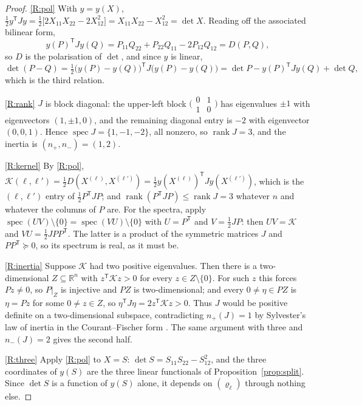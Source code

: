 \documentclass[11pt,a4paper]{article}
\theoremstyle{plain}
\theoremstyle{definition}
\newcommand{\R}{\mathbb{R}}
\newcommand{\T}{\mathsf{T}}
\newcommand{\PSD}{\succeq 0}
\DeclareMathOperator{\rank}{rank}
\begin{document}
\begin{proof}
\ref{R:pol} With $y=y(X)$,
$\tfrac12y^{\T}Jy=\tfrac12\bigl[2X_{11}X_{22}-2X_{12}^{2}\bigr]
=X_{11}X_{22}-X_{12}^{2}=\det X$. Reading off the associated bilinear form,
\[
  y(P)^{\T}Jy(Q)=P_{11}Q_{22}+P_{22}Q_{11}-2P_{12}Q_{12}=D(P,Q),
\]
so $D$ is the polarisation of $\det$, and since $y$ is linear,
\[
  \det(P-Q)=\tfrac12\bigl(y(P)-y(Q)\bigr)^{\T}J\bigl(y(P)-y(Q)\bigr)
  =\det P-y(P)^{\T}Jy(Q)+\det Q,
\]
which is the third relation.

\ref{R:rank} $J$ is block diagonal: the upper-left block
$\bigl(\begin{smallmatrix}0&1\\1&0\end{smallmatrix}\bigr)$ has eigenvalues
$\pm1$ with eigenvectors $(1,\pm1,0)$, and the remaining diagonal entry is
$-2$ with eigenvector $(0,0,1)$. Hence $\operatorname{spec}J=\{1,-1,-2\}$, all
nonzero, so $\rank J=3$, and the inertia is $(n_+,n_-)=(1,2)$.

\ref{R:kernel} By \ref{R:pol},
$\mathcal K(\ell,\ell')=\tfrac12D(X^{(\ell)},X^{(\ell')})
=\tfrac12y(X^{(\ell)})^{\T}Jy(X^{(\ell')})$, which is the $(\ell,\ell')$ entry
of $\tfrac12P^{\T}JP$; and $\rank(P^{\T}JP)\le\rank J=3$ whatever $n$ and
whatever the columns of $P$ are. For the spectra, apply
$\operatorname{spec}(UV)\setminus\{0\}
=\operatorname{spec}(VU)\setminus\{0\}$ with $U=P^{\T}$ and
$V=\tfrac12JP$: then $UV=\mathcal K$ and $VU=\tfrac12JPP^{\T}$. The latter is a
product of the symmetric matrices $J$ and $PP^{\T}\PSD$, so its spectrum is
real, as it must be.

\ref{R:inertia} Suppose $\mathcal K$ had two positive eigenvalues. Then there
is a two-dimensional $Z\subseteq\R^{n}$ with $z^{\T}\mathcal Kz>0$ for every
$z\in Z\setminus\{0\}$. For such $z$ this forces $Pz\ne0$, so $P|_Z$ is
injective and $PZ$ is two-dimensional; and every $0\ne\eta\in PZ$ is $\eta=Pz$
for some $0\ne z\in Z$, so $\eta^{\T}J\eta=2z^{\T}\mathcal Kz>0$. Thus $J$
would be positive definite on a two-dimensional subspace, contradicting
$n_+(J)=1$ by Sylvester's law of inertia \cite{Sylvester1852} in the
Courant--Fischer form \cite{CourantFischer1920}. The same argument with three
and $n_-(J)=2$ gives the second half.

\ref{R:three} Apply \ref{R:pol} to $X=S$: $\det S=S_{11}S_{22}-S_{12}^{2}$,
and the three coordinates of $y(S)$ are the three linear functionals of
Proposition~\ref{prop:split}. Since $\det S$ is a function of $y(S)$ alone, it
depends on $(\varrho_\ell)$ through nothing else.
\end{proof}
\end{document}
